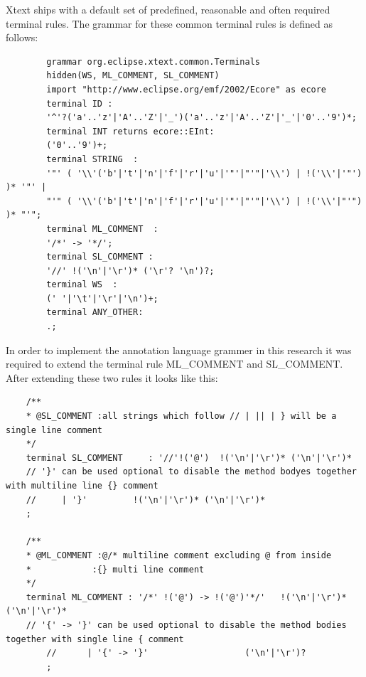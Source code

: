 Xtext ships with a default set of predefined, reasonable and often required terminal rules. The grammar for these common terminal rules is defined as follows:
	\begin{lstlisting}
		grammar org.eclipse.xtext.common.Terminals 
		hidden(WS, ML_COMMENT, SL_COMMENT)
		import "http://www.eclipse.org/emf/2002/Ecore" as ecore
		terminal ID : 
		'^'?('a'..'z'|'A'..'Z'|'_')('a'..'z'|'A'..'Z'|'_'|'0'..'9')*;
		terminal INT returns ecore::EInt: 
		('0'..'9')+;
		terminal STRING  : 
		'"' ( '\\'('b'|'t'|'n'|'f'|'r'|'u'|'"'|"'"|'\\') | !('\\'|'"') )* '"' |
		"'" ( '\\'('b'|'t'|'n'|'f'|'r'|'u'|'"'|"'"|'\\') | !('\\'|"'") )* "'"; 
		terminal ML_COMMENT  : 
		'/*' -> '*/';
		terminal SL_COMMENT : 
		'//' !('\n'|'\r')* ('\r'? '\n')?;
		terminal WS  : 
		(' '|'\t'|'\r'|'\n')+;
		terminal ANY_OTHER: 
		.;
	\end{lstlisting}

In order to implement the annotation language grammer in this research it was required to extend the terminal rule ML\_COMMENT and SL\_COMMENT. After extending these two rules it looks like this:

\begin{lstlisting}
	/**
	* @SL_COMMENT :all strings which follow // | || | } will be a single line comment
	*/ 
	terminal SL_COMMENT 	: '//'!('@')  !('\n'|'\r')* ('\n'|'\r')*
	// '}' can be used optional to disable the method bodyes together with multiline line {} comment 
	//     | '}'         !('\n'|'\r')* ('\n'|'\r')*               
	;
	
	/**
	* @ML_COMMENT :@/* multiline comment excluding @ from inside
	*            :{} multi line comment 
	*/ 
	terminal ML_COMMENT	: '/*' !('@') -> !('@')'*/'   !('\n'|'\r')* ('\n'|'\r')*   
	// '{' -> '}' can be used optional to disable the method bodies together with single line { comment 
		//      | '{' -> '}'                   ('\n'|'\r')?
		;   
\end{lstlisting}

